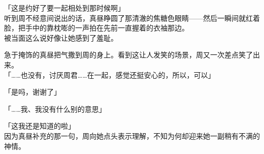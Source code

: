 「这是约好了要一起相处到那时候啊」\\

听到周不经意间说出的话，真昼睁圆了那清澈的焦糖色眼睛——然后一瞬间就红着脸，把手中的靠枕嘭的一声拍在先前一直握着的衣袖那边。\\

被当面这么说好像让她感到了羞耻。

急于掩饰的真昼把气撒到周的身上。看到这让人发笑的场景，周又一次差点笑了出来。\\

「……也没有，讨厌周君……在一起，感觉还挺安心的，所以，可以」

「是吗，谢谢了」

「……我、我没有什么别的意思」

「这我还是知道的啦」\\

因为真昼补充的那一句，周向她点头表示理解，不知为何却迎来她一副稍有不满的神情。
